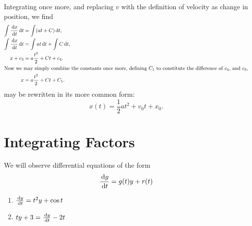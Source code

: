 \begin{ex}
    Integrating once more, and replacing $v$ with the definition of velocity as change in position, we find
    \begin{align}
        \int \frac{\,\mathrm{d} x}{\,\mathrm{d} t} \,\mathrm{d} t &= \int (at + C) \,\mathrm{d} t, \nonumber \\
        \int \frac{\,\mathrm{d} x}{\,\mathrm{d} t} \,\mathrm{d} t &= \int at \,\mathrm{d} t + \int C \,\mathrm{d} t, \nonumber \\
        x + c_3  &= a \frac{t^2}{2} + Ct + c_4. \nonumber \\
        \intertext{Now we may simply combine the constants once more, defining $C_1$ to constitute the difference of $c_4$, and $c_3$,}
        x &= a \frac{t^2}{2} + Ct + C_1. \label{eq:phys_const}
    \end{align}
     may be rewritten in its more common form:
    \begin{equation}
        x(t) = \frac{1}{2} a t^2 + v_0 t + x_0.
        \label{eq:position}
    \end{equation}
\end{ex}

\section{Integrating Factors}
We will observe differential equations of the form
\begin{equation}
  \frac{\,\mathrm{d} y}{\,\mathrm{d} t} = g(t) y + r(t)
\end{equation}
\begin{enumerate}
  \item $\frac{\,\mathrm{d} y}{\,\mathrm{d} t} = t^2 y + \cos{t}$
  \item $t y +3=\frac{\,\mathrm{d} y}{\,\mathrm{d} t}-2t$
\end{enumerate}
